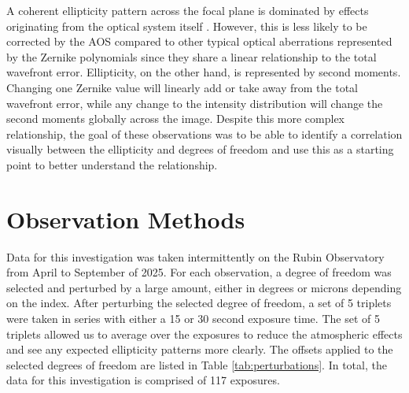\documentclass[SE,lsstdraft,authoryear,toc]{lsstdoc}
\begin{document}
A coherent ellipticity pattern across the focal plane is dominated by effects originating from the optical system itself \cite{Jarvis2008}. 
However, this is less likely to be corrected by the AOS compared to other typical optical aberrations represented by the Zernike polynomials since they share a linear relationship to the total wavefront error. 
Ellipticity, on the other hand, is represented by second moments. 
Changing one Zernike value will linearly add or take away from the total wavefront error, while any change to the intensity distribution will change the second moments globally across the image. 
Despite this more complex relationship, the goal of these observations was to be able to identify a correlation visually between the ellipticity and degrees of freedom and use this as a starting point to better understand the relationship.  

\section{Observation Methods}

Data for this investigation was taken intermittently on the Rubin Observatory from April to September of 2025.
For each observation, a degree of freedom was selected and perturbed by a large amount, either in degrees or microns depending on the index.
After perturbing the selected degree of freedom, a set of 5 triplets were taken in series with either a 15 or 30 second exposure time.
The set of 5 triplets allowed us to average over the exposures to reduce the atmospheric effects and see any expected ellipticity patterns more clearly.
The offsets applied to the selected degrees of freedom are listed in Table \ref{tab:perturbations}.
In total, the data for this investigation is comprised of 117 exposures. 
\end{document}
